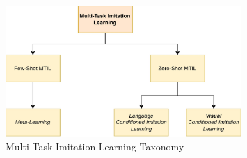 \begin{figure}[t]
    \centering
    \includegraphics[width=0.8\textwidth]{figures/images/MTIL_taxonomy.jpg}
    \caption{Multi-Task Imitation Learning Taxonomy}
    \label{fig:mtil_taxonomy}
    
\end{figure}
